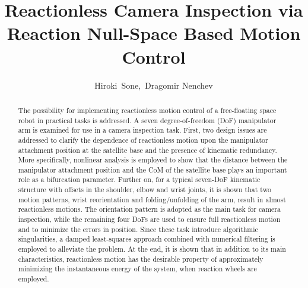 \documentclass[preprint,12pt]{elsarticle}
\begin{document}
\begin{frontmatter}



\title{ Reactionless Camera Inspection via Reaction Null-Space Based Motion Control}


\author[tcu]{Hiroki~Sone,~Dragomir Nenchev}
\address[tcu]{Department of Mechanical Systems Engineering, Graduate School of Engineering, Tokyo City University, 1-28-1, Tamazutsumi, Setagaya-ku, Tokyo, 158-8557, Japan}

 
\begin{abstract}
  The possibility for implementing reactionless motion control of a free-floating space robot in practical 
  tasks is addressed.  A  seven degree-of-freedom (DoF) manipulator arm is examined  for use in a camera inspection task. 
  First, two  design issues are addressed to clarify the dependence of  reactionless motion upon the manipulator attachment 
  position at the satellite base and  the presence of  kinematic redundancy. 
  More specifically,  nonlinear analysis is employed to show 
  that the distance between the manipulator attachment position and the CoM of the satellite base plays an important role as  a 
  bifurcation parameter. Further on, for a typical seven-DoF kinematic structure with offsets in the shoulder, 
  elbow and wrist joints, it is shown that two motion patterns,  
  wrist reorientation and folding/unfolding of the arm, result in almost reactionless motions.
  The orientation pattern is adopted as the main task for camera inspection, while the remaining four DoFs are used to
  ensure full reactionless motion and to minimize the errors in position. Since these task introduce algorithmic singularities,
  a damped least-squares approach  combined with numerical filtering is employed to alleviate the problem.
  At the end, it is shown that in addition to its main characteristics, reactionless motion has the desirable property of
  approximately minimizing the instantaneous  energy of the system,  when reaction wheels are employed.
\end{abstract}


\end{frontmatter}
\end{document}
